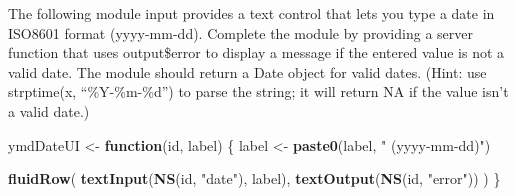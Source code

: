 \documentclass[]{book}
\newenvironment{Shaded}{\begin{snugshade}}{\end{snugshade}}
\newcommand{\ControlFlowTok}[1]{\textcolor[rgb]{0.13,0.29,0.53}{\textbf{#1}}}
\newcommand{\KeywordTok}[1]{\textcolor[rgb]{0.13,0.29,0.53}{\textbf{#1}}}
\newcommand{\NormalTok}[1]{#1}
\newcommand{\StringTok}[1]{\textcolor[rgb]{0.31,0.60,0.02}{#1}}
\begin{document}
The following module input provides a text control that lets you type a date in ISO8601 format (yyyy-mm-dd). Complete the module by providing a server function that uses output\$error to display a message if the entered value is not a valid date. The module should return a Date object for valid dates. (Hint: use strptime(x, ``\%Y-\%m-\%d'') to parse the string; it will return NA if the value isn't a valid date.)

\begin{Shaded}
\begin{Highlighting}[]
\NormalTok{ymdDateUI <-}\StringTok{ }\ControlFlowTok{function}\NormalTok{(id, label) \{}
\NormalTok{  label <-}\StringTok{ }\KeywordTok{paste0}\NormalTok{(label, }\StringTok{" (yyyy-mm-dd)"}\NormalTok{)}

  \KeywordTok{fluidRow}\NormalTok{(}
    \KeywordTok{textInput}\NormalTok{(}\KeywordTok{NS}\NormalTok{(id, }\StringTok{"date"}\NormalTok{), label),}
    \KeywordTok{textOutput}\NormalTok{(}\KeywordTok{NS}\NormalTok{(id, }\StringTok{"error"}\NormalTok{))}
\NormalTok{  )}
\NormalTok{\}}
\end{Highlighting}
\end{Shaded}
\end{document}
